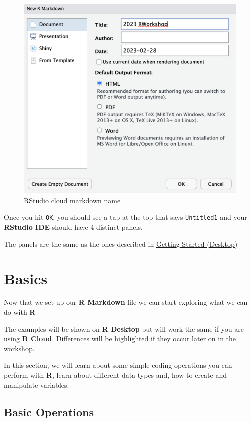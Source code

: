 \documentclass[
]{book}
\begin{document}
\begin{figure}
\includegraphics[width=16.14in]{images/2.4rmarkdown} \caption{RStudio cloud markdown name}\label{fig:unnamed-chunk-11}
\end{figure}

Once you hit \texttt{OK}, you should see a tab at the top that says \texttt{Untitled1} and your \textbf{RStudio IDE} should have 4 distinct panels.

The panels are the same as the ones described in \protect\hyperlink{getting-started-desktop}{Getting Started (Desktop)}

\hypertarget{basics}{%
\chapter{Basics}\label{basics}}

Now that we set-up our \textbf{R Markdown} file we can start exploring what we can do with \textbf{R}

The examples will be shown on \textbf{R Desktop} but will work the same if you are using \textbf{R Cloud}. Differences will be highlighted if they occur later on in the workshop.

In this section, we will learn about some simple coding operations you can perform with \textbf{R}, learn about different data types and, how to create and manipulate variables.

\hypertarget{basic-operations}{%
\section{Basic Operations}\label{basic-operations}}
\end{document}
